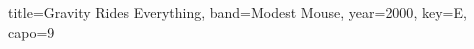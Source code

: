 \documentclass{skrul-leadsheet}
\begin{document}
\begin{song}[transpose-capo=true]{title={Gravity Rides Everything}, band={Modest Mouse}, year={2000}, key={E}, capo={9}}



\end{song}
\end{document}
